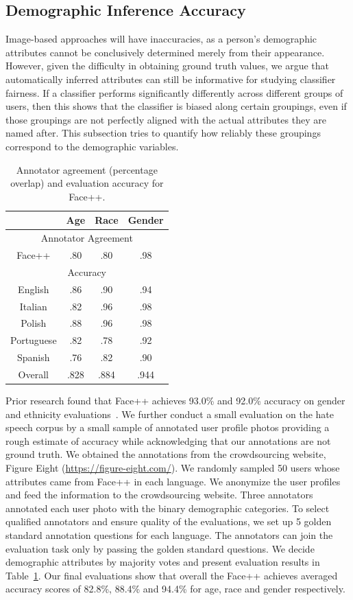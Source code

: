 \subsection{Demographic Inference Accuracy}

Image-based approaches will have inaccuracies, as a person's demographic attributes cannot be conclusively determined merely from their appearance. 
However, given the difficulty in obtaining ground truth values, we argue that automatically inferred attributes can still be informative for studying classifier fairness. 
If a classifier performs significantly differently across different groups of users, then this shows that the classifier is biased along certain groupings, even if those groupings are not perfectly aligned with the actual attributes they are named after. 
This subsection tries to quantify how reliably these groupings correspond to the demographic variables.


\begin{table}[th]
\centering
\begin{tabular}{c||c|c|c}
 & Age & Race & Gender \\ \hline
\multicolumn{4}{c}{Annotator Agreement} \\ \hline
Face++ & .80 & .80 & .98 \\ \hline
\multicolumn{4}{c}{Accuracy} \\ \hline
English & .86 & .90 & .94 \\ \hline
Italian & .82 & .96 & .98 \\ \hline
Polish & .88 & .96 & .98 \\ \hline
Portuguese & .82 & .78 & .92 \\ \hline
Spanish & .76 & .82 & .90 \\ \hline
Overall & .828 & .884 & .944 \\ 
\end{tabular}
\caption{Annotator agreement (percentage overlap) and evaluation accuracy for Face++.}
\label{chap5:tab:api_eval}
\end{table}

Prior research found that Face++ achieves 93.0\% and 92.0\% accuracy on gender and ethnicity evaluations~\cite{jung2018assessing}.
We further conduct a small evaluation on the hate speech corpus by a small sample of annotated user profile photos providing a rough estimate of accuracy while acknowledging that our annotations are not ground truth.
We obtained the annotations from the crowdsourcing website, Figure Eight (\url{https://figure-eight.com/}).
We randomly sampled 50 users whose attributes came from Face++ in each language.
We anonymize the user profiles and feed the information to the crowdsourcing website.
Three annotators annotated each user photo with the binary demographic categories.
To select qualified annotators and ensure quality of the evaluations, we set up 5 golden standard annotation questions for each language.
The annotators can join the evaluation task only by passing the golden standard questions.
We decide demographic attributes by majority votes and present evaluation results in Table~\ref{chap5:tab:api_eval}.
Our final evaluations show that overall the Face++ achieves averaged accuracy scores of 82.8\%, 88.4\% and 94.4\% for age, race and gender respectively.

